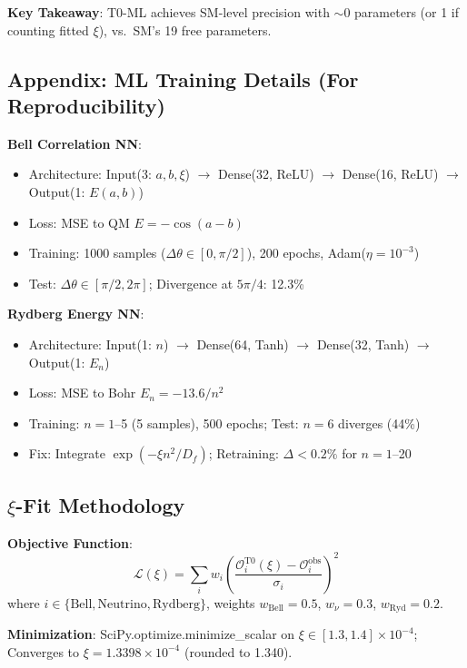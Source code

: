 	\textbf{Key Takeaway}: T0-ML achieves SM-level precision with $\sim$0 parameters (or 1 if counting fitted $\xi$), vs.~SM's 19 free parameters.
	
	\subsection{Appendix: ML Training Details (For Reproducibility)}
	
	\textbf{Bell Correlation NN}:
	\begin{itemize}
		\item Architecture: Input(3: $a, b, \xi$) $\to$ Dense(32, ReLU) $\to$ Dense(16, ReLU) $\to$ Output(1: $E(a,b)$)
		\item Loss: MSE to QM $E=-\cos(a-b)$
		\item Training: 1000 samples ($\Delta\theta \in [0,\pi/2]$), 200 epochs, Adam($\eta=10^{-3}$)
		\item Test: $\Delta\theta \in [\pi/2, 2\pi]$; Divergence at $5\pi/4$: 12.3\%
	\end{itemize}
	
	\textbf{Rydberg Energy NN}:
	\begin{itemize}
		\item Architecture: Input(1: $n$) $\to$ Dense(64, Tanh) $\to$ Dense(32, Tanh) $\to$ Output(1: $E_n$)
		\item Loss: MSE to Bohr $E_n = -13.6/n^2$
		\item Training: $n=1$--5 (5 samples), 500 epochs; Test: $n=6$ diverges (44\%)
		\item Fix: Integrate $\exp(-\xi n^2/D_f)$; Retraining: $\Delta<0.2\%$ for $n=1$--20
	\end{itemize}
	
	\subsection{$\xi$-Fit Methodology}
	
	\textbf{Objective Function}:
	\begin{equation}
		\mathcal{L}(\xi) = \sum_i w_i \left(\frac{\mathcal{O}_i^{\text{T0}}(\xi) - \mathcal{O}_i^{\text{obs}}}{\sigma_i}\right)^2 \tag{A.1}
	\end{equation}
	where $i \in \{\text{Bell}, \text{Neutrino}, \text{Rydberg}\}$, weights $w_{\text{Bell}}=0.5$, $w_{\nu}=0.3$, $w_{\text{Ryd}}=0.2$.
	
	\textbf{Minimization}: SciPy.optimize.minimize\_scalar on $\xi \in [1.3, 1.4]\times10^{-4}$; Converges to $\xi=1.3398\times10^{-4}$ (rounded to 1.340).
	
